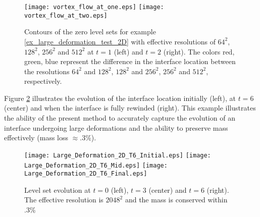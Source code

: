 \documentclass[english]{article}
\begin{document}
\begin{figure}
\begin{center}
\texttt{[image: vortex\_flow\_at\_one.eps]}
\texttt{[image: vortex\_flow\_at\_two.eps]}
\end{center}
\caption{Contours of the zero level sets for example
\ref{ex_large_deformation_test_2D} with effective resolutions of $64^2$,
$128^2$, $256^2$ and $512^2$ at $t=1$ (left) and $t=2$ (right). The colors
red, green, blue represent the difference in the interface location between
the resolutions $64^2$ and $128^2$, $128^2$ and $256^2$, $256^2$ and
$512^2$, respectively.} \label{fig_vortex_test}
\end{figure}

Figure \ref{large_deformation_test_2D} illustrates the evolution of the
interface location initially (left), at $t=6$ (center) and when the
interface is fully rewinded (right). This example illustrates the ability
of the present method to accurately capture the evolution of an interface
undergoing large deformations and the ability to preserve mass effectively
(mass loss $\approx.3\%$).

\begin{figure}
\begin{center}
\texttt{[image: Large\_Deformation\_2D\_T6\_Initial.eps]}
\texttt{[image: Large\_Deformation\_2D\_T6\_Mid.eps]}
\texttt{[image: Large\_Deformation\_2D\_T6\_Final.eps]}
\end{center}
\caption{Level set evolution at $t=0$ (left), $t=3$ (center) and $t=6$ (right). The effective
resolution is $2048^2$ and the mass is conserved within .3\%} \label{large_deformation_test_2D}
\end{figure}

\end{document}
